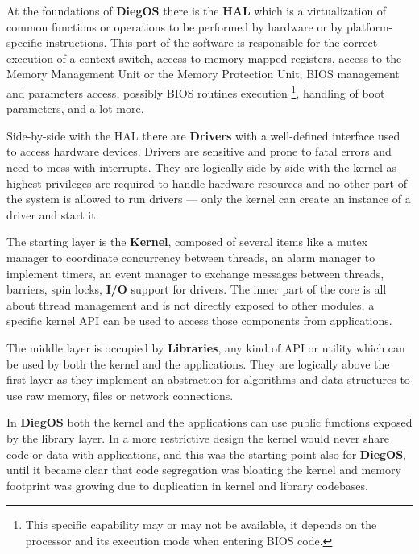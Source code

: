 \documentclass[11pt,b5paper]{scrbook}
\newcommand{\myOS}{{\color{SteelBlue}\textbf{DiegOS}}}
\begin{document}
At the foundations of {\myOS} there is the {\color{Red}\textbf{HAL}} which is a virtualization of
common functions or operations to be performed by hardware or by platform-specific instructions.
This part of the software is responsible for the correct execution of a context switch,
access to memory-mapped registers, access to the Memory Management Unit or the Memory Protection Unit,
BIOS management and parameters access, possibly BIOS routines execution
\footnote{This specific capability may or may not be available, it depends on the processor and
its execution mode when entering BIOS code.},
handling of boot parameters, and a lot more.

Side-by-side with the HAL there are {\color{Violet}\textbf{Drivers}} with a well-defined interface used to access hardware
devices. Drivers are sensitive and prone to fatal errors and need to mess with
interrupts. They are logically side-by-side with the kernel as highest privileges are required to
handle hardware resources and no other part of the system is allowed to run drivers --- only the kernel
can create an instance of a driver and start it.

The starting layer is the {\color{Cyan}\textbf{Kernel}},
composed of several items like a mutex manager to coordinate
concurrency between threads, an alarm manager to implement timers, an event manager
to exchange messages between threads, barriers, spin locks, \textbf{I/O} support for drivers.
The inner part of the core is all about thread management and is not directly exposed
to other modules, a specific kernel API can be used to access those components
from applications.

The middle layer is occupied by {\color{Yellow}\textbf{Libraries}}, any kind of API or utility
which can be used by both the kernel and the applications.
They are logically above the first layer as they implement an abstraction for algorithms
 and data structures to use raw memory, files or network connections.

In {\myOS} both the kernel and the applications can
use public functions exposed by the library layer.
In a more restrictive design the kernel would never share code or data with
applications, and this was the starting point also for {\myOS}, until it became
clear that code segregation was bloating the kernel and memory footprint was growing due to duplication
in kernel and library codebases.
\end{document}
